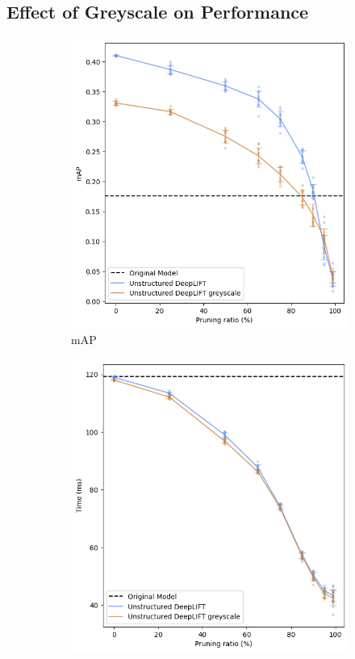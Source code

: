 \documentclass[journal,onecolumn,12pt]{IEEEtran}
\begin{document}
\subsection{Effect of Greyscale on Performance}
\label{sec3}
\begin{figure}
    \centering
    \captionsetup{justification=centering}
    \begin{subfigure}[b]{.5\textwidth}
      \centering
      \includegraphics[width=1\linewidth]{figures/mAP2.PNG}
      \caption{mAP}
      \label{fig:mAP2}
    \end{subfigure}%
    \begin{subfigure}[b]{.5\textwidth}
      \centering
      \includegraphics[width=1\linewidth]{figures/time2.PNG}

\end{subfigure}
\end{figure}
\end{document}
